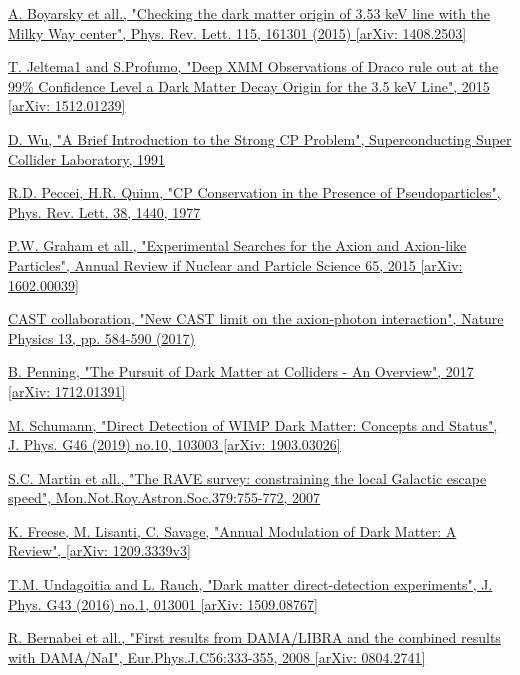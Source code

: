 \documentclass[a4paper, 10pt, openright]{report}
\begin{document}
\begin{thebibliography}{1}
\href{https://arxiv.org/abs/1408.2503}{A. Boyarsky et all.,
"Checking the dark matter origin of 3.53 keV line with the Milky Way center",
Phys. Rev. Lett. 115, 161301 (2015) [arXiv: 1408.2503]
}

\href{https://arxiv.org/abs/1512.01239}{T. Jeltema1 and S.Profumo,
"Deep XMM Observations of Draco rule out at the 99\% Confidence Level a Dark Matter Decay Origin for the 3.5 keV Line",
2015 [arXiv: 1512.01239]
}

\href{https://www.osti.gov/servlets/purl/6260191}{D. Wu,
"A Brief Introduction to the Strong CP Problem",
Superconducting Super Collider Laboratory, 1991
}

\href{https://journals.aps.org/prl/abstract/10.1103/PhysRevLett.38.1440}{R.D. Peccei, H.R. Quinn,
"CP Conservation in the Presence of Pseudoparticles",
Phys. Rev. Lett. 38, 1440, 1977
}

\href{https://arxiv.org/abs/1602.00039}{P.W. Graham et all.,
"Experimental Searches for the Axion and Axion-like Particles",
Annual Review if Nuclear and Particle Science 65, 2015 [arXiv: 1602.00039]
}

\href{https://www.nature.com/articles/nphys4109}{CAST collaboration,
"New CAST limit on the axion-photon interaction",
Nature Physics 13, pp. 584-590 (2017)
}

\href{https://arxiv.org/abs/1712.01391}{B. Penning,
"The Pursuit of Dark Matter at Colliders - An Overview",
2017 [arXiv: 1712.01391]
}

\href{https://arxiv.org/abs/1903.03026}{M. Schumann,
"Direct Detection of WIMP Dark Matter: Concepts and Status",
J. Phys. G46 (2019) no.10, 103003 [arXiv: 1903.03026]
}

\href{https://arxiv.org/abs/astro-ph/0611671}{S.C. Martin et all.,
"The RAVE survey: constraining the local Galactic escape speed",
Mon.Not.Roy.Astron.Soc.379:755-772, 2007
}

\href{https://arxiv.org/abs/1209.3339}{K. Freese, M. Lisanti, C. Savage,
"Annual Modulation of Dark Matter: A Review",
[arXiv: 1209.3339v3]
}

\href{https://arxiv.org/abs/1509.08767}{T.M. Undagoitia and L. Rauch,
"Dark matter direct-detection experiments",
J. Phys. G43 (2016) no.1, 013001 [arXiv: 1509.08767]
}

\href{https://arxiv.org/abs/0804.2741}{R. Bernabei et all.,
"First results from DAMA/LIBRA and the combined results with DAMA/NaI",
Eur.Phys.J.C56:333-355, 2008 [arXiv: 0804.2741]
}


\end{thebibliography}
\end{document}

